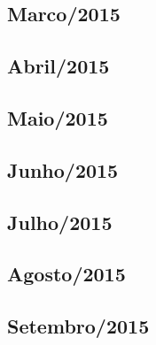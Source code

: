\documentclass[12pt,a4paper]{article}
\begin{document}
\subsection{Marco/2015}
  
 
\subsection{Abril/2015}
  
  
\subsection{Maio/2015} 
  
  
  
   
\subsection{Junho/2015}
   
   
   
%   
%   

\subsection{Julho/2015}
    
     
    
    
     
    
    
\subsection{Agosto/2015}
   
   
   
%   
% 

\subsection{Setembro/2015}
  
   
      
    
 
\end{document}
